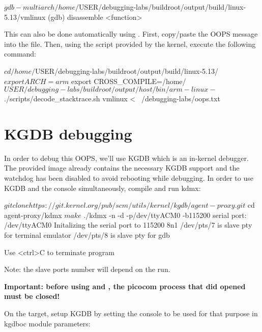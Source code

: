 \begin{bashinput}
$ gdb-multiarch /home/$USER/debugging-labs/buildroot/output/build/linux-5.13/vmlinux
(gdb) disassemble <function>
\end{bashinput}

This can also be done automatically using . First,
copy/paste the OOPS message into the  file.
Then, using the script provided by the kernel, execute the following command:

\begin{bashinput}
$ cd /home/$USER/debugging-labs/buildroot/output/build/linux-5.13/
$ export ARCH=arm
$ export CROSS_COMPILE=/home/$USER/debugging-labs/buildroot/output/host/bin/arm-linux-
$ ./scripts/decode_stacktrace.sh vmlinux < ~/debugging-labs/oops.txt
\end{bashinput}

\section{KGDB debugging}
In order to debug this OOPS, we'll use KGDB which is an in-kernel debugger.
The provided image already contains the necessary KGDB support and the watchdog
has been disabled to avoid rebooting while debugging. In order to use KGDB and
the console simultaneously, compile and run kdmx:

\begin{bashinput}
$ git clone https://git.kernel.org/pub/scm/utils/kernel/kgdb/agent-proxy.git
$ cd agent-proxy/kdmx
$ make
$ ./kdmx -n -d -p/dev/ttyACM0 -b115200
serial port: /dev/ttyACM0
Initalizing the serial port to 115200 8n1
/dev/pts/7 is slave pty for terminal emulator
/dev/pts/8 is slave pty for gdb

Use <ctrl>C to terminate program
\end{bashinput}

Note: the slave ports number will depend on the run.

\textbf{Important: before using  and , the
picocom process that did opened  must be closed!}

On the target, setup KGDB by setting the console to be used for that purpose in
kgdboc module parameters:


